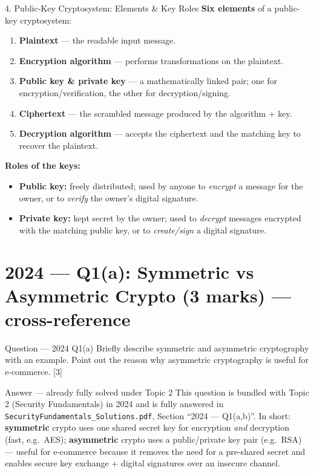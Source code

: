 \documentclass[12pt,a4paper]{article}
\begin{document}
\begin{algobox}{4. Public-Key Cryptosystem: Elements \& Key Roles}
\textbf{Six elements} of a public-key cryptosystem:
\begin{enumerate}[noitemsep]
  \item \textbf{Plaintext} --- the readable input message.
  \item \textbf{Encryption algorithm} --- performs transformations on the plaintext.
  \item \textbf{Public key \& private key} --- a mathematically linked pair; one for encryption/verification, the other for decryption/signing.
  \item \textbf{Ciphertext} --- the scrambled message produced by the algorithm + key.
  \item \textbf{Decryption algorithm} --- accepts the ciphertext and the matching key to recover the plaintext.
\end{enumerate}
\textbf{Roles of the keys:}
\begin{itemize}[noitemsep]
  \item \textbf{Public key:} freely distributed; used by anyone to \emph{encrypt} a message for the owner, or to \emph{verify} the owner's digital signature.
  \item \textbf{Private key:} kept secret by the owner; used to \emph{decrypt} messages encrypted with the matching public key, or to \emph{create/sign} a digital signature.
\end{itemize}
\end{algobox}

\newpage
\section{2024 --- Q1(a): Symmetric vs Asymmetric Crypto (3 marks) --- cross-reference}

\begin{qbox}{Question --- 2024 Q1(a)}
Briefly describe symmetric and asymmetric cryptography with an example. Point out the reason why asymmetric cryptography is useful for e-commerce. \hfill [3]
\end{qbox}

\begin{solbox}{Answer --- already fully solved under Topic 2}
This question is bundled with Topic 2 (Security Fundamentals) in 2024 and is fully answered in \texttt{SecurityFundamentals\_Solutions.pdf}, Section ``2024 --- Q1(a,b)''. In short: \textbf{symmetric} crypto uses one shared secret key for encryption \emph{and} decryption (fast, e.g.\ AES); \textbf{asymmetric} crypto uses a public/private key pair (e.g.\ RSA) --- useful for e-commerce because it removes the need for a pre-shared secret and enables secure key exchange + digital signatures over an insecure channel.
\end{solbox}
\end{document}
